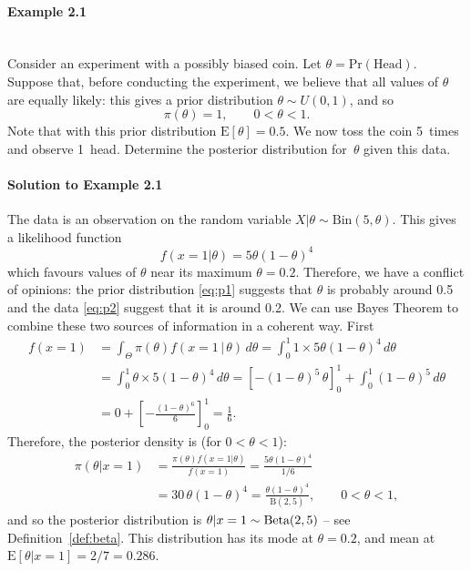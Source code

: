 \paragraph{Example 2.1}{~\\
Consider an experiment with a possibly biased coin. Let
\label{ex:coin}
$\theta=\text{Pr}(\text{Head})$. Suppose that, before conducting the experiment, we believe that all values of $\theta$ are equally likely: this gives a prior distribution $\theta\sim U(0,1)$, and so
\begin{equation} 
\pi(\theta)=1,\quad\quad0<\theta<1.
\label{eq:p1}
\end{equation}
Note that with this prior distribution $\text{E}[\theta]=0.5$. We now toss the coin 5~times and observe 1~head. Determine the posterior distribution for~$\theta$ given this data.

\paragraph{Solution to Example 2.1}{

    
        The data is an observation on the random variable $X|\theta\sim
        \text{Bin}(5,\theta)$. This gives a likelihood function
        \begin{equation}
        f(x=1|\theta)=5\theta(1-\theta)^4
        \label{eq:p2}
        \end{equation}
        which favours values of $\theta$ near its maximum
        $\theta=0.2$. Therefore, we have a conflict of opinions: the prior
        distribution \eqref{eq:p1} suggests that $\theta$ is probably around
        0.5 and the data \eqref{eq:p2} suggest that it is around 0.2. We can
        use Bayes Theorem to combine these two sources of information in a
        coherent way. First
        \begin{align*}
        f(x=1) &=\int_\Theta\pi(\theta)f(x=1\, |\,\theta)\,d\theta = \int_0^1 1\times 5\theta(1-\theta)^4\,d\theta \\
        &=\int_0^1 \theta\times 5(1-\theta)^4\,d\theta =\left[-(1-\theta)^5\,\theta\right]^1_0
        +\int_0^1 (1-\theta)^5\,d\theta \\
        &=0 + \left[-\frac{(1-\theta)^6}{6}\right]^1_0 =\frac{1}{6}. 
        \end{align*}
        Therefore, the posterior density is (for $0<\theta<1$):
        \begin{align*}
        \pi(\theta|x=1)&=\frac{\pi(\theta)f(x=1|\theta)}{f(x=1)} =\frac{5\theta(1-\theta)^4}{1/6}\\
        &=30\,\theta(1-\theta)^4 =\frac{\theta(1-\theta)^4}{\mathrm{B}(2,5)},\quad\quad 0<\theta<1,
        \end{align*}
        and so the posterior distribution is $\theta|x=1\sim \textnormal{\text{Beta}}(2,5)$ -- see
        Definition~\ref{def:beta}.  This distribution has its mode at
        $\theta=0.2$, and mean at $\text{E}[\theta|x=1]=2/7=0.286$.
    
}}
